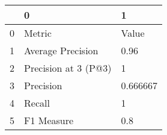 \begin{tabular}{lll}
\toprule
{} &                     0 &         1 \\
\midrule
0 &                Metric &     Value \\
1 &     Average Precision &      0.96 \\
2 &  Precision at 3 (P@3) &         1 \\
3 &             Precision &  0.666667 \\
4 &                Recall &         1 \\
5 &            F1 Measure &       0.8 \\
\bottomrule
\end{tabular}
